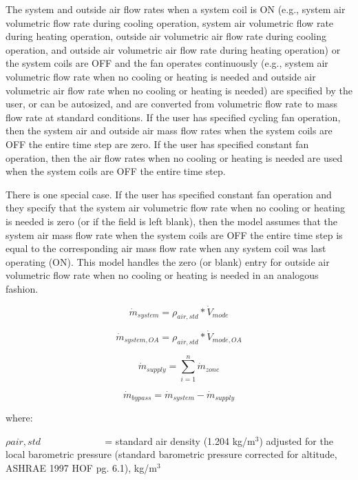 The system and outside air flow rates when a system coil is ON (e.g., system air volumetric flow rate during cooling operation, system air volumetric flow rate during heating operation, outside air volumetric air flow rate during cooling operation, and outside air volumetric air flow rate during heating operation) or the system coils are OFF and the fan operates continuously (e.g., system air volumetric flow rate when no cooling or heating is needed and outside air volumetric air flow rate when no cooling or heating is needed) are specified by the user, or can be autosized, and are converted from volumetric flow rate to mass flow rate at standard conditions. If the user has specified cycling fan operation, then the system air and outside air mass flow rates when the system coils are OFF the entire time step are zero. If the user has specified constant fan operation, then the air flow rates when no cooling or heating is needed are used when the system coils are OFF the entire time step.

There is one special case. If the user has specified constant fan operation and they specify that the system air volumetric flow rate when no cooling or heating is needed is zero (or if the field is left blank), then the model assumes that the system air mass flow rate when the system coils are OFF the entire time step is equal to the corresponding air mass flow rate when any system coil was last operating (ON). This model handles the zero (or blank) entry for outside air volumetric flow rate when no cooling or heating is needed in an analogous fashion.

\begin{equation}
{\dot m_{system}} = {\rho_{air,std}}*{\dot V_{mode}}
\end{equation}

\begin{equation}
{\dot m_{system,OA}} = {\rho_{air,std}}*{\dot V_{mode,OA}}
\end{equation}

\begin{equation}
{\dot m_{supply}} = \sum\limits_{i = 1}^n {{{\dot m}_{zone}}}
\end{equation}

\begin{equation}
{\dot m_{bypass}} = {\dot m_{system}} - {\dot m_{supply}}
\end{equation}

where:

\(\rho air,std\) ~~~~~~~~~~~~ = standard air density (1.204 kg/m\(^{3}\)) adjusted for the local barometric pressure (standard barometric pressure corrected for altitude, ASHRAE 1997 HOF pg. 6.1), kg/m\(^{3}\)


